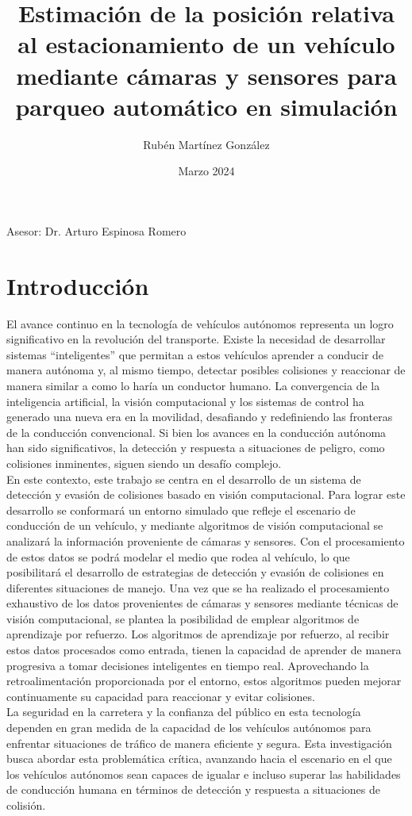 \documentclass[12pt,letterpaper,final]{article}
\title{Estimación de la posición relativa al estacionamiento de un vehículo mediante cámaras y sensores para parqueo automático en simulación}
\author{Rubén Martínez González}
\date{Marzo 2024}
\begin{document}
    \maketitle
    \begin{center}
        Asesor: Dr. Arturo Espinosa Romero

    \end{center}
    \clearpage

    \section*{Introducción}
    \noindent
    El avance continuo en la tecnología de vehículos autónomos representa un logro significativo en la revolución del transporte.
    Existe la necesidad de desarrollar sistemas ``inteligentes'' que permitan a estos vehículos aprender a conducir de manera autónoma y,
    al mismo tiempo, detectar posibles colisiones y reaccionar de manera similar a como lo haría un conductor humano.
    La convergencia de la inteligencia artificial, la visión computacional y los sistemas de control ha generado una nueva era en la movilidad,
    desafiando y redefiniendo las fronteras de la conducción convencional.
    Si bien los avances en la conducción autónoma han sido significativos, la detección y respuesta a
    situaciones de peligro, como colisiones inminentes, siguen siendo un desafío complejo.\\ \newline
    En este contexto, este trabajo se centra en el desarrollo de un sistema de detección y evasión de colisiones basado en visión computacional.
    Para lograr este desarrollo se conformará un entorno simulado que refleje el escenario de conducción de un vehículo,
    y mediante algoritmos de visión computacional se analizará la información proveniente de cámaras y sensores.
    Con el procesamiento de estos datos se podrá modelar el medio que rodea al vehículo, lo que posibilitará
    el desarrollo de estrategias de detección y evasión de colisiones en diferentes situaciones de manejo.
    Una vez que se ha realizado el procesamiento exhaustivo de los datos provenientes de cámaras y sensores mediante técnicas de visión computacional,
    se plantea la posibilidad de emplear algoritmos de aprendizaje por refuerzo.
    Los algoritmos de aprendizaje por refuerzo, al recibir estos datos procesados como entrada, tienen la capacidad de aprender de manera progresiva
    a tomar decisiones inteligentes en tiempo real.
    Aprovechando la retroalimentación proporcionada por el entorno, estos algoritmos pueden mejorar continuamente su capacidad para reaccionar y evitar colisiones.\\ \newline
    La seguridad en la carretera y la confianza del público en esta tecnología dependen en gran medida de la capacidad
    de los vehículos autónomos para enfrentar situaciones de tráfico de manera eficiente y segura.
    Esta investigación busca abordar esta problemática crítica, avanzando hacia el escenario en el que los vehículos autónomos
    sean capaces de igualar e incluso superar las habilidades de conducción humana en términos de detección y respuesta
    a situaciones de colisión.
    \clearpage
\end{document}
